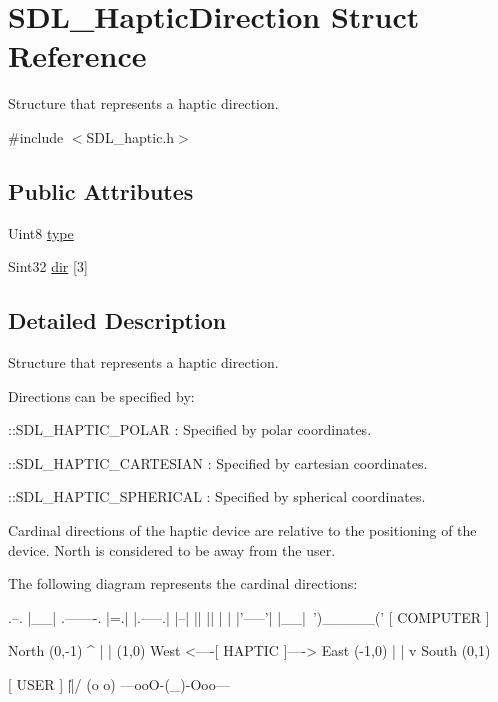 \hypertarget{structSDL__HapticDirection}{\section{S\+D\+L\+\_\+\+Haptic\+Direction Struct Reference}
\label{structSDL__HapticDirection}
}


Structure that represents a haptic direction.  




{\ttfamily \#include $<$S\+D\+L\+\_\+haptic.\+h$>$}

\subsection*{Public Attributes}
\begin{DoxyCompactItemize}
\item 
Uint8 \hyperlink{structSDL__HapticDirection_acd6830ad68c4ba2af16057fa418087cc}{type}
\item 
Sint32 \hyperlink{structSDL__HapticDirection_a6b1083eefcfe8db7d9bbfd660e0373a9}{dir} \mbox{[}3\mbox{]}
\end{DoxyCompactItemize}


\subsection{Detailed Description}
Structure that represents a haptic direction. 

Directions can be specified by\+:
\begin{DoxyItemize}
\item \+::\+S\+D\+L\+\_\+\+H\+A\+P\+T\+I\+C\+\_\+\+P\+O\+L\+A\+R \+: Specified by polar coordinates.
\item \+::\+S\+D\+L\+\_\+\+H\+A\+P\+T\+I\+C\+\_\+\+C\+A\+R\+T\+E\+S\+I\+A\+N \+: Specified by cartesian coordinates.
\item \+::\+S\+D\+L\+\_\+\+H\+A\+P\+T\+I\+C\+\_\+\+S\+P\+H\+E\+R\+I\+C\+A\+L \+: Specified by spherical coordinates.
\end{DoxyItemize}

Cardinal directions of the haptic device are relative to the positioning of the device. North is considered to be away from the user.

The following diagram represents the cardinal directions\+: \begin{DoxyVerb}             .--.
             |__| .-------.
             |=.| |.-----.|
             |--| ||     ||
             |  | |'-----'|
             |__|~')_____('
               [ COMPUTER ]


                 North (0,-1)
                     ^
                     |
                     |
(1,0)  West <----[ HAPTIC ]----> East (-1,0)
                     |
                     |
                     v
                  South (0,1)


                  [ USER ]
                    \|||/
                    (o o)
              ---ooO-(_)-Ooo---
\end{DoxyVerb}


